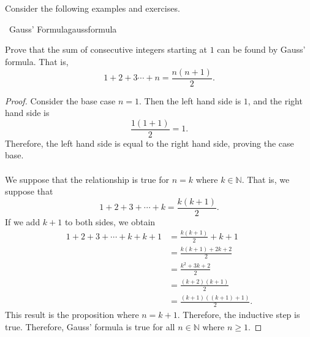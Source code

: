         \pagebreak
        \vphantom
        \\
        \\
        Consider the following examples and exercises.
        \begin{example}{\Difficulty\,\Difficulty\,\,Gauss' Formula}{gaussformula}
        
            Prove that the sum of consecutive integers starting at \(1\) can be found by Gauss' formula. That is,
            \begin{equation*}
                1+2+3\cdots+n=\frac{n(n+1)}{2}.
            \end{equation*}
            \begin{proof}
                Consider the base case \(n=1\). Then the left hand side is \(1\), and the right hand side is
                \begin{equation*}
                    \frac{1(1+1)}{2}=1.
                \end{equation*}
                Therefore, the left hand side is equal to the right hand side, proving the case base.
                \\
                \\
                We suppose that the relationship is true for \(n=k\) where \(k\in\mathbb{N}\). That is, we suppose that
                \begin{equation*}
                    1+2+3+\cdots+k=\frac{k(k+1)}{2}.
                \end{equation*}
                If we add \(k+1\) to both sides, we obtain
                \begin{align*}
                    1+2+3+\cdots+k+k+1&=\frac{k(k+1)}{2}+k+1 \\
                    &=\frac{k(k+1)+2k+2}{2} \\
                    &=\frac{k^2+3k+2}{2} \\
                    &=\frac{(k+2)(k+1)}{2} \\
                    &=\frac{(k+1)((k+1)+1)}{2}.
                \end{align*}
                This result is the proposition where \(n=k+1\). Therefore, the inductive step is true. Therefore, Gauss' formula is true for all \(n\in\mathbb{N}\) where \(n \geq 1\).
            \end{proof}
        
        \end{example}
        \pagebreak
